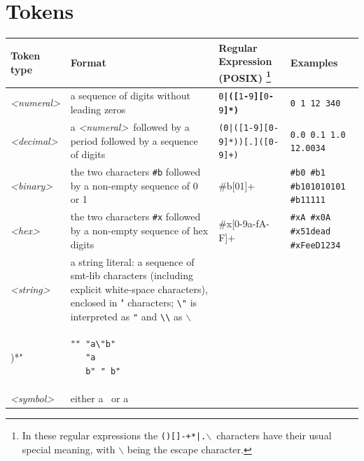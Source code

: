 \documentclass[12pt,oneside]{report}
\newcommand{\sym}{{\it <symbol>}}
\newcommand{\ssym}{{\it <simple-symbol>}}
\newcommand{\qsym}{{\it <quoted-symbol>}}
\newcommand{\numeral}{{\it <numeral>}}
\newcommand{\decimal}{{\it <decimal>}}
\newcommand{\binary}{{\it <binary>}}
\newcommand{\hex}{{\it <hex>}}
\newcommand{\strng}{{\it <string>}} %
\newcommand{\bae}[1]{\begin{array}{l}\\#1\\\end{array}}
\begin{document}
\section{Tokens}
\label{Tokens}

\begin{table}
\begin{tabular}{|l|p{2.8in}|p{2.75in}|p{1.0in}|}
\hline
Token type & Format & Regular Expression (POSIX)
\footnote{In these regular expressions the {\tt ()[]-+*|.$\backslash$}~characters have their usual\cite{POSIX} special meaning, with $\backslash$ being the escape character. }
 & Examples \\
\hline
\numeral 
& a sequence of digits without leading zeros 
& {\tt 0\textbf{|}\textbf{([}1\textbf{-}9\textbf{][}0\textbf{-}9\textbf{]*)} } & {\tt 0 1 12 340 } 
\\ \hline

\decimal 
& a \numeral\ followed by a period followed by a sequence of digits 
& {\tt (0|([1-9][0-9]*))[.]([0-9]+) } 
& {\tt 0.0 0.1 1.0 12.0034} 
\\ \hline

\binary 
& the two characters {\tt \#b} followed by a non-empty sequence of 0 or 1 
& \#b[01]+ 
& {\tt \#b0 \#b1 \#b101010101 \#b11111 } 
\\ \hline

\hex 
& the two characters {\tt \#x} followed by a non-empty sequence of hex digits 
& \#x[0-9a-fA-F]+ 
& {\tt \#xA \#x0A \#x51dead \#xFeeD1234 } 
\\ \hline

\strng 
& a string literal: a sequence of smt-lib characters (including explicit white-space characters), enclosed in " characters; \verb|\"| is interpreted as {\tt "} and \verb|\\| as {\tt $\backslash$} 
&
\begin{verbatim}"([]!#-[^-~ \t\r\n]|\\[!-~])*"\end{verbatim}
&
\begin{verbatim}"" "a\"b" 
   "a
   b" " b"\end{verbatim} 
\\ \hline
 
\sym 
& either a \ssym~or a \qsym 
& 
& 
\\ \hline


\end{tabular}
\end{table}
\end{document}
